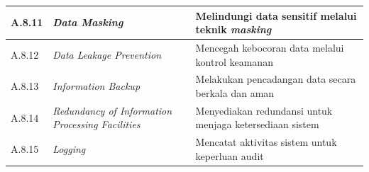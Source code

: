 \begin{table}[H]
\begin{tabular}{|P{1.6cm}|P{5.0cm}|P{6.4cm}|}
\hline
A.8.11 & \textit{Data Masking}                                                 & Melindungi data sensitif melalui teknik \textit{masking} \\
\hline
A.8.12 & \textit{Data Leakage Prevention}                                      & Mencegah kebocoran data melalui kontrol keamanan \\
\hline
A.8.13 & \textit{Information Backup}                                           & Melakukan pencadangan data secara berkala dan aman \\
\hline
A.8.14 & \textit{Redundancy of Information Processing Facilities}              & Menyediakan redundansi untuk menjaga ketersediaan sistem \\
\hline
A.8.15 & \textit{Logging}                                                      & Mencatat aktivitas sistem untuk keperluan audit \\
\hline
\end{tabular}
\end{table}

